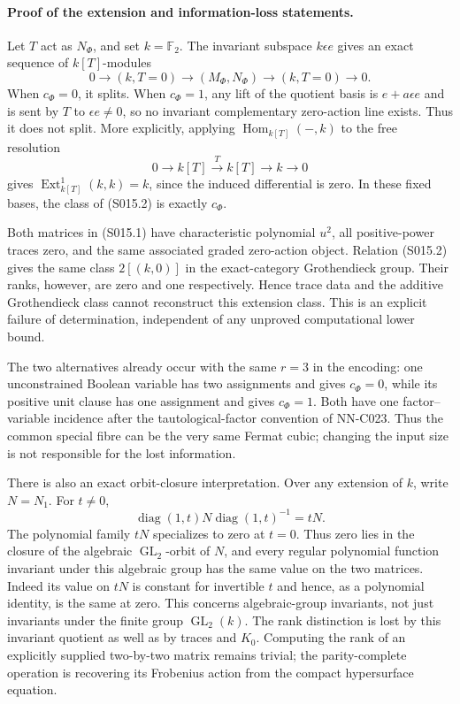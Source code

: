 \paragraph{Proof of the extension and information-loss statements.}
Let $T$ act as $N_\Phi$, and set $k=\mathbb F_2$.
The invariant subspace $k\epsilon e$ gives an exact sequence of
$k[T]$-modules
\[
 0\longrightarrow(k,T=0)\longrightarrow(M_\Phi,N_\Phi)
     \longrightarrow(k,T=0)\longrightarrow0.          \tag{S015.2}
\]
When $c_\Phi=0$, it splits. When $c_\Phi=1$, any lift of the
quotient basis is $e+a\epsilon e$ and is sent by $T$ to
$\epsilon e\ne0$, so no invariant complementary zero-action
line exists. Thus it does not split.
More explicitly, applying $\operatorname{Hom}_{k[T]}(-,k)$ to
the free resolution
\[
 0\longrightarrow k[T]\xrightarrow{T}k[T]
       \longrightarrow k\longrightarrow0
\]
gives $\operatorname{Ext}^1_{k[T]}(k,k)=k$, since the induced
differential is zero. In these fixed bases, the class of
(S015.2) is exactly $c_\Phi$.

Both matrices in (S015.1) have characteristic polynomial $u^2$,
all positive-power traces zero, and the same associated graded
zero-action object. Relation (S015.2) gives the same class
$2[(k,0)]$ in the exact-category Grothendieck group. Their ranks,
however, are zero and one respectively. Hence trace data and the
additive Grothendieck class cannot reconstruct this extension class.
This is an explicit failure of determination, independent of any
unproved computational lower bound.

The two alternatives already occur with the same $r=3$ in the
encoding: one unconstrained Boolean variable has two assignments
and gives $c_\Phi=0$, while its positive unit clause has one assignment
and gives $c_\Phi=1$. Both have one factor--variable incidence after
the tautological-factor convention of NN-C023. Thus the common
special fibre can be the very same Fermat cubic; changing the
input size is not responsible for the lost information.

There is also an exact orbit-closure interpretation. Over any extension
of $k$, write $N=N_1$. For $t\ne0$,
\[
 \operatorname{diag}(1,t)N\operatorname{diag}(1,t)^{-1}=tN.
\]
The polynomial family $tN$ specializes to zero at $t=0$. Thus zero
lies in the closure of the algebraic $\operatorname{GL}_2$-orbit of
$N$, and every regular polynomial function invariant under this
algebraic group has the same value on the two matrices. Indeed its
value on $tN$ is constant for invertible $t$ and hence, as a polynomial
identity, is the same at zero. This concerns algebraic-group invariants,
not just invariants under the finite group $\operatorname{GL}_2(k)$.
The rank distinction is lost by this invariant quotient as well as by
traces and $K_0$. Computing the rank of an explicitly supplied
two-by-two matrix remains trivial; the parity-complete operation is
recovering its Frobenius action from the compact hypersurface equation.

